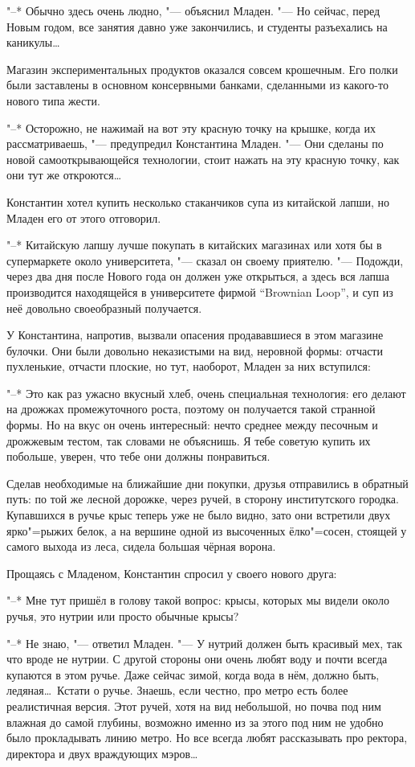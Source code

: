 "--* Обычно здесь очень людно, "--- объяснил Младен.
"--- Но сейчас, перед Новым годом, все занятия давно уже закончились, и студенты
разъехались на каникулы\ldots

Магазин экспериментальных продуктов оказался совсем крошечным.
Его полки были заставлены в основном консервными банками, сделанными из
какого-то нового типа жести.

"--* Осторожно, не нажимай на вот эту красную точку на крышке, когда их
рассматриваешь, "--- предупредил Константина Младен.
"--- Они сделаны по новой самооткрывающейся технологии, стоит нажать на эту
красную точку, как они тут же откроются\ldots

Константин хотел купить несколько стаканчиков супа из китайской лапши, но Младен
его от этого отговорил.

"--* Китайскую лапшу лучше покупать в китайских магазинах или хотя бы в
супермаркете около университета, "--- сказал он своему приятелю.
"--- Подожди, через два дня после Нового года он должен уже открыться, а здесь
вся лапша производится находящейся в университете фирмой
\enquote{\foreignlanguage{english}{Brownian Loop}},
и суп из неё довольно своеобразный получается.

У Константина, напротив, вызвали опасения продававшиеся в этом магазине булочки.
Они были довольно неказистыми на вид, неровной формы: отчасти пухленькие,
отчасти плоские, но тут, наоборот, Младен за них вступился:

"--* Это как раз ужасно вкусный хлеб, очень специальная технология: его делают
на дрожжах промежуточного роста, поэтому он получается такой странной формы.
Но на вкус он очень интересный: нечто среднее между песочным и дрожжевым тестом,
так словами не объяснишь.
Я тебе советую купить их побольше, уверен, что тебе они должны понравиться.

Сделав необходимые на ближайшие дни покупки, друзья отправились в обратный путь:
по той же лесной дорожке, через ручей, в сторону институтского городка.
Купавшихся в ручье крыс теперь уже не было видно, зато они встретили двух
ярко"=рыжих белок, а на вершине одной из высоченных ёлко"=сосен, стоящей у
самого выхода из леса, сидела большая чёрная ворона.

Прощаясь с Младеном, Константин спросил у своего нового друга:

"--* Мне тут пришёл в голову такой вопрос: крысы, которых мы видели около ручья,
это нутрии или просто обычные крысы?

"--* Не знаю, "--- ответил Младен.
"--- У нутрий должен быть красивый мех, так что вроде не нутрии.
С другой стороны они очень любят воду и почти всегда купаются в этом ручье.
Даже сейчас зимой, когда вода в нём, должно быть, ледяная\ldots\
Кстати о ручье.
Знаешь, если честно, про метро есть более реалистичная версия.
Этот ручей, хотя на вид небольшой, но почва под ним влажная до самой глубины,
возможно именно из за этого под ним не удобно было прокладывать линию метро.
Но все всегда любят рассказывать про ректора, директора и двух враждующих
мэров\ldots


